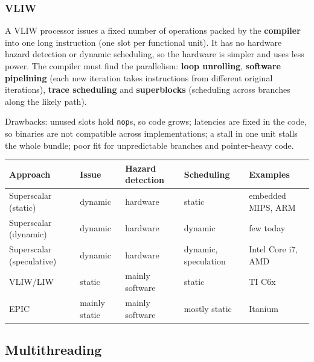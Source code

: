 \subsubsection{VLIW}
\begin{definition}
A VLIW processor issues a fixed number of operations packed by the
\textbf{compiler} into one long instruction (one slot per functional unit). It has no
hardware hazard detection or dynamic scheduling, so the hardware is simpler and uses
less power. The compiler must find the parallelism: \textbf{loop unrolling},
\textbf{software pipelining} (each new iteration takes instructions from different
original iterations), \textbf{trace scheduling} and \textbf{superblocks} (scheduling
across branches along the likely path).
\end{definition}
Drawbacks: unused slots hold \texttt{nop}s, so code grows; latencies are fixed in the
code, so binaries are not compatible across implementations; a stall in one unit
stalls the whole bundle; poor fit for unpredictable branches and pointer-heavy code.

\begin{center}
\small
\begin{tabular}{@{}P{3.3cm}P{2cm}P{2.4cm}P{3.2cm}P{2.6cm}@{}}
\toprule
Approach & Issue & Hazard detection & Scheduling & Examples \\
\midrule
Superscalar (static) & dynamic & hardware & static & embedded MIPS, ARM \\
Superscalar (dynamic) & dynamic & hardware & dynamic & few today \\
Superscalar (speculative) & dynamic & hardware & dynamic, speculation & Intel Core i7, AMD \\
VLIW/LIW & static & mainly software & static & TI C6x \\
EPIC & mainly static & mainly software & mostly static & Itanium \\
\bottomrule
\end{tabular}
\end{center}

\subsection{Multithreading}
\label{sec:multithreading}

